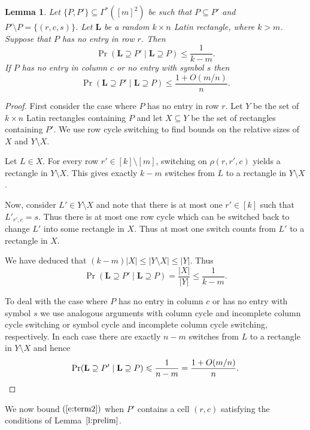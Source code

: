 \documentclass[12pt]{article}
\newtheorem{lem}[thm]{Lemma}
\theoremstyle{definition}
\numberwithin{equation}{section}
\def\eref#1{$(\ref{#1})$}
\def\lref#1{Lemma~$\ref{#1}$}
\renewcommand{\leq}{\leqslant}
\renewcommand{\L}{\mathbf{L}}
\begin{document}
	\begin{lem}\label{l:newrcs}
		Let $\{P, P'\} \subseteq \Gamma^*([m]^2)$ be such that $P \subseteq
		P'$ and $P' \setminus P = \{(r, c, s)\}$. Let $\L$ be a random
		$k\times n$ Latin rectangle, where $k>m$. Suppose that $P$ has no
		entry in row $r$. Then
		\begin{equation*}
			\Pr(\L \supseteq P' \mid  \L \supseteq P) \leq \frac1{k-m}.
		\end{equation*}
		If $P$ has no entry in column $c$ or no entry with symbol $s$ then
		\begin{equation*}
			\Pr(\L \supseteq P' \mid  \L \supseteq P) \leq \frac{1+O(m/n)}n.
		\end{equation*}
	\end{lem}
	
	\begin{proof}
		First consider the case where $P$ has no entry in row $r$. Let $Y$
		be the set of $k \times n$ Latin rectangles containing $P$ and let $X
		\subseteq Y$ be the set of rectangles containing $P'$. We use row cycle
		switching to find bounds on the relative sizes of $X$ and $Y\setminus X$.
		
		Let $L \in X$. For every row $r' \in [k]\setminus [m]$, switching
		on $\rho(r, r', c)$ yields a rectangle in $Y \setminus X$. This gives
		exactly $k-m$ switches from $L$ to a rectangle in $Y \setminus X$.
		
		Now, consider $L' \in Y \setminus X$ and note that there is at most
		one $r' \in [k]$ such that $L'_{r',c}=s$. Thus there is at most one
		row cycle which can be switched back to change $L'$ into some
		rectangle in $X$.  Thus at most one switch counts from $L'$ to a
		rectangle in $X$.
		
		We have deduced that $(k-m)|X| \leq |Y \setminus X| \leq |Y|$. Thus
		\[
		\Pr(\L \supseteq P' \mid  \L \supseteq P) = \frac{|X|}{|Y|} \leq \frac1{k-m}.
		\]
		
		To deal with the case where $P$ has no entry in column $c$ or has no
		entry with symbol $s$ we use analogous arguments with column cycle
		and incomplete column cycle switching or symbol cycle and incomplete
		column cycle switching, respectively. In each case there are
		exactly $n-m$ switches from $L$ to a rectangle in $Y \setminus X$ and
		hence
		\[
		\Pr(\L \supseteq P' \mid  \L \supseteq P) \leq \frac1{n-m}=\frac{1+O(m/n)}n.\qedhere
		\]
	\end{proof}
	
	We now bound \eref{e:term2} when $P'$ contains a cell $(r,c)$
	satisfying the conditions of \lref{l:prelim}.
	
\end{document}
